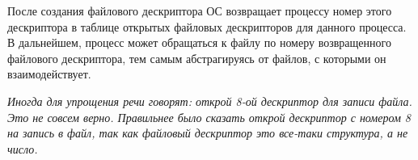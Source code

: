 После создания файлового дескриптора ОС возвращает процессу номер этого дескриптора в таблице открытых файловых дескрипторов для данного процесса. В дальнейшем, процесс может обращаться к файлу по номеру возвращенного файлового дескриптора, тем самым абстрагируясь от файлов, с которыми он взаимодействует.

\textit{Иногда для упрощения речи говорят: открой 8-ой дескриптор для записи файла. Это не совсем верно. Правильнее было сказать открой дескриптор с номером 8 на запись в файл, так как файловый дескриптор это все-таки структура, а не число.}
